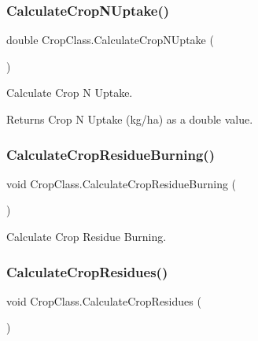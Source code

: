 \subsubsection{\texorpdfstring{CalculateCropNUptake()}{CalculateCropNUptake()}}
{\footnotesize\ttfamily double Crop\+Class.\+Calculate\+Crop\+N\+Uptake (\begin{DoxyParamCaption}{ }\end{DoxyParamCaption})\hspace{0.3cm}{\ttfamily [inline]}}



Calculate Crop N Uptake. 

\begin{DoxyReturn}{Returns}
Crop N Uptake (kg/ha) as a double value. 
\end{DoxyReturn}
\mbox{\label{class_crop_class_ad07cc1a644d7c6987571094a60c4af94}} 
\subsubsection{\texorpdfstring{CalculateCropResidueBurning()}{CalculateCropResidueBurning()}}
{\footnotesize\ttfamily void Crop\+Class.\+Calculate\+Crop\+Residue\+Burning (\begin{DoxyParamCaption}{ }\end{DoxyParamCaption})\hspace{0.3cm}{\ttfamily [inline]}}



Calculate Crop Residue Burning. 

\mbox{\label{class_crop_class_a37721141ba2db316dc8a5f0c4f91d2bf}} 
\subsubsection{\texorpdfstring{CalculateCropResidues()}{CalculateCropResidues()}}
{\footnotesize\ttfamily void Crop\+Class.\+Calculate\+Crop\+Residues (\begin{DoxyParamCaption}{ }\end{DoxyParamCaption})\hspace{0.3cm}{\ttfamily [inline]}}



